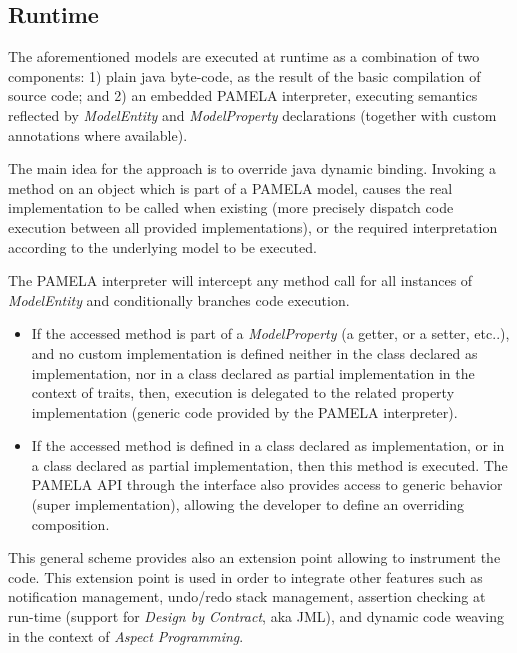  \subsection{Runtime}
 \label{sub:RunTime}
 
 The aforementioned models are executed at runtime as a combination of two components: 1) plain java byte-code, as the result of the basic compilation of source code; and 2) an embedded PAMELA interpreter, executing semantics reflected by \emph{ModelEntity} and \emph{ModelProperty}  declarations (together with custom annotations where available).

The main idea for the approach is to override java dynamic binding. Invoking a method on an object which is part of a PAMELA model, causes the real implementation to be called when existing (more precisely dispatch code execution between all provided implementations), or the required interpretation according to the underlying model to be executed. 
 
The PAMELA interpreter will intercept any method call for all instances of \emph{ModelEntity} and conditionally branches code execution.
 \begin{itemize}
     \item If the accessed method is part of a \emph{ModelProperty} (a getter, or a setter, etc..), and no custom implementation is defined neither in the class declared as implementation, nor in a class declared as partial implementation in the context of traits, then, execution is delegated to the related property implementation (generic code provided by the PAMELA interpreter).
     \item If the accessed method is defined in a class declared as implementation, or in a class declared as partial implementation, then this method is executed. The PAMELA API through the  interface also provides access to generic behavior (super implementation), allowing the developer to define an overriding composition.
 \end{itemize}
 
This general scheme provides also an extension point allowing to instrument the code. This extension point is used in order to integrate other features such as notification management, undo/redo stack management, assertion checking at run-time (support for \emph{Design by Contract}, aka JML), and dynamic code weaving in the context of \emph{Aspect Programming}.


